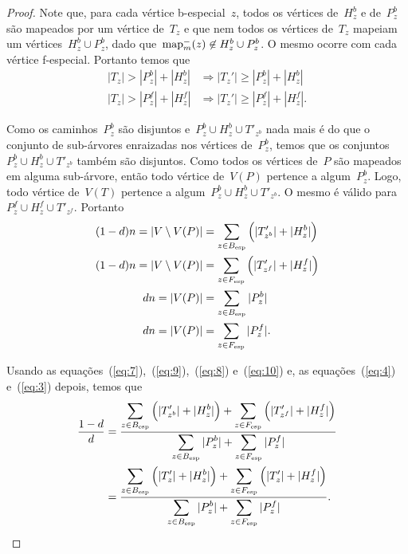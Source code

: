 \begin{proof}
	Note que, para cada vértice b-especial~$z$, todos os vértices 
	de~$H^b_z$ e de~$P^b_z$ são mapeados por um vértice 
	de~$T_z$ e que nem todos os vértices de~$T_z$ mapeiam um
	vértices~$H^b_z\cup P_z^b$, 
	dado que~$\mathrm{map}^-_m(z)\not\in H^b_z\cup P_z^b$.
	O mesmo ocorre com cada vértice f-especial.
	Portanto temos que
	\begin{align}
		|T_z| > |P^b_z| + |H^b_z| 
		&\Rightarrow
		|T_z'| \ge |P^b_z| + |H^b_z| \label{eq:5}\\
		|T_z| > |P^f_z| + |H^f_z|
		&\Rightarrow
		|T_z'| \ge |P^f_z| + |H^f_z| \label{eq:6}.
	\end{align}

	Como os caminhos~$P^b_z$ são disjuntos e~$P^b_z\cup H^b_z\cup T'_{z^b}$
	nada mais é do que o conjunto de sub-árvores enraizadas
	nos vértices de~$P^b_z$, temos 
	que os conjuntos~${P^b_z\cup H^b_z\cup T'_{z^b}}$ também são disjuntos.
	Como todos os vértices de~$P$ são mapeados em alguma sub-árvore,
	então todo vértice de~$V(P)$ pertence a algum~$P^b_z$.
	Logo,
	todo vértice de~$V(T)$ pertence a 
	algum~${P^b_z\cup H^b_z\cup T'_{z^b}}$.
	O mesmo é válido para~${P^f_z\cup H^f_z\cup T'_{z^f}}$.
	Portanto
	\begin{align}
		(1-d)n = |V\setminus V(P)| &= 
		\displaystyle\sum_{z\in B_{\mathrm{esp}}}\Big(|T_{z^b}'|+|H_z^b|\Big)
		\label{eq:7}\\
		(1-d)n = |V\setminus V(P)| &= 
		\displaystyle\sum_{z\in F_{\mathrm{esp}}}\Big(|T_{z^f}'|+|H_z^f|\Big)
		\label{eq:9}\\
		dn = |V(P)| &= 
		\displaystyle\sum_{z\in B_{\mathrm{esp}}}|P_z^b|
		\label{eq:8}\\
		dn = |V(P)| &= 
		\displaystyle\sum_{z\in F_{\mathrm{esp}}}|P_z^f| 
		\label{eq:10}.
	\end{align}

	Usando as equações~(\ref{eq:7}),~(\ref{eq:9}),~(\ref{eq:8}) e~(\ref{eq:10})
	e, as equações~(\ref{eq:4}) e~(\ref{eq:3}) depois, temos que
	\begin{align}
		\dfrac{1-d}{d} &= 
		\dfrac{
			\displaystyle\sum_{z\in B_{\mathrm{esp}}}
			\Big(|T'_{z^b}|+|H_z^b|\Big) + 
			\displaystyle\sum_{z\in F_{\mathrm{esp}}}
			\Big(|T'_{z^f}|+|H_z^f|\Big)}
			{\displaystyle\sum_{z\in B_{\mathrm{esp}}}|P_z^b| +
			\displaystyle\sum_{z\in F_{\mathrm{esp}}}|P_z^f|}
			\nonumber\\
		&= \dfrac{
			\displaystyle\sum_{z\in B_{\mathrm{esp}}}
			\Big(|T'_{z}|+|H_z^b|\Big) + 
			\displaystyle\sum_{z\in F_{\mathrm{esp}}}
			\Big(|T'_{z}|+|H_z^f|\Big)}
			{\displaystyle\sum_{z\in B_{\mathrm{esp}}}|P_z^b| +
			\displaystyle\sum_{z\in F_{\mathrm{esp}}}|P_z^f|}.
			\nonumber
	\end{align}
			

\end{proof}

